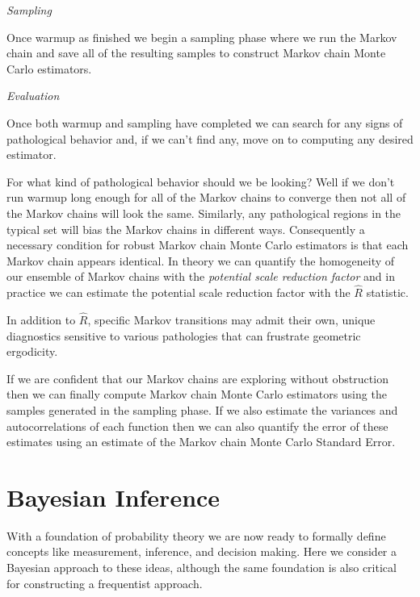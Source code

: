 \documentclass[11pt, oneside]{article}
\begin{document}
\vspace{2mm}
\noindent \emph{Sampling}
\vspace{2mm}

Once warmup as finished we begin a sampling phase where
we run the Markov chain and save all of the resulting samples
to construct Markov chain Monte Carlo estimators.

\vspace{2mm}
\noindent \emph{Evaluation}
\vspace{2mm}

Once both warmup and sampling have completed we can
search for any signs of pathological behavior and, if we
can't find any, move on to computing any desired estimator.

For what kind of pathological behavior should we be looking?
Well if we don't run warmup long enough for all of the Markov
chains to converge then not all of the Markov chains will look 
the same.  Similarly, any pathological regions in the typical set 
will bias the Markov chains in different ways.  Consequently a 
necessary condition for robust Markov chain Monte Carlo 
estimators is that each Markov chain appears identical.  In theory
we can quantify the homogeneity of our ensemble of Markov chains 
with the \emph{potential scale reduction factor} and in practice we
can estimate the potential scale reduction factor with the $\hat{R}$
statistic.

In addition to $\hat{R}$, specific Markov transitions may admit
their own, unique diagnostics sensitive to various pathologies
that can frustrate geometric ergodicity.

If we are confident that our Markov chains are exploring without
obstruction then we can finally compute Markov chain Monte
Carlo estimators using the samples generated in the sampling
phase.  If we also estimate the variances and autocorrelations
of each function then we can also quantify the error of these
estimates using an estimate of the Markov chain Monte Carlo
Standard Error.

\section{Bayesian Inference}

With a foundation of probability theory we are now ready to
formally define concepts like measurement, inference, and 
decision making.  Here we consider a Bayesian approach
to these ideas, although the same foundation is also critical
for constructing a frequentist approach.
\end{document}
